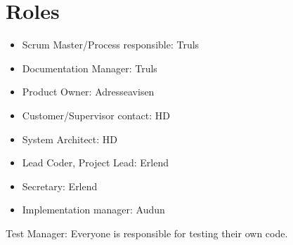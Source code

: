 \section{Roles}
\begin{itemize}
\item Scrum Master/Process responsible: Truls
\item Documentation Manager: Truls
\item Product Owner: Adresseavisen
\item Customer/Supervisor contact: HD
\item System Architect: HD
\item Lead Coder, Project Lead: Erlend
\item Secretary: Erlend
\item Implementation manager: Audun 
\end{itemize}


Test Manager: Everyone is responsible for testing their own code.